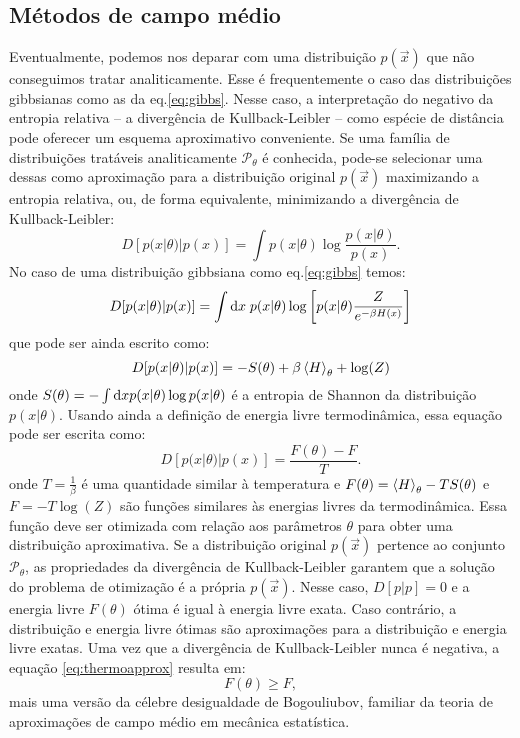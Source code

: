 \subsection{Métodos de campo médio}
Eventualmente, podemos nos deparar com uma distribuição $p(\vec{x})$ que não conseguimos tratar analiticamente. Esse é frequentemente o caso das distribuições gibbsianas como as da eq.\eqref{eq:gibbs}. Nesse caso, a interpretação do negativo da entropia relativa -- a divergência de Kullback-Leibler -- como espécie de distância pode oferecer um esquema aproximativo conveniente. Se uma família de distribuições tratáveis analiticamente $\mathcal{P}_\theta$ é conhecida, pode-se selecionar uma dessas como aproximação para a distribuição original $p(\vec{x})$ maximizando a entropia relativa, ou, de forma equivalente, minimizando a divergência de Kullback-Leibler:
\begin{equation}
 D[ p(x|\theta)|p(x) ] = \int p(x|\theta) \log\frac{p(x|\theta)}{p(x)}.
\end{equation}
No caso de uma distribuição gibbsiana como eq.\eqref{eq:gibbs} temos:
\begin{equation*}
 D[ p(x|\theta)|p(x) ] = \int \mathrm{d} x\; p(x|\theta) \log\left[p(x|\theta)\frac{Z}{e^{-\beta H(x)}}\right]
\end{equation*}
que pode ser ainda escrito como:
\[
 D[ p(x|\theta)|p(x) ] = - S(\theta)  + \beta \left\langle H \right\rangle_{\theta}  + \log(Z)
\]
onde $S(\theta) = - \int \mathrm{d} x p(x|\theta) \log p(x|\theta)$ é a entropia de Shannon da distribuição $p(x|\theta)$. Usando ainda a definição de energia livre termodinâmica, essa equação pode ser escrita como:
\begin{equation}
\label{eq:thermoapprox}
 D[ p(x|\theta)|p(x) ] = \dfrac{F(\theta) - F}{T}.
\end{equation}
onde $T = \frac{1}{\beta}$ é uma quantidade similar à temperatura e $F(\theta) = \left\langle H \right\rangle_{\theta} - T S(\theta)$ e $F = -T\log(Z)$ são funções similares às energias livres da termodinâmica. Essa função deve ser otimizada com relação aos parâmetros $\theta$ para obter uma distribuição aproximativa. Se a distribuição original $p(\vec{x})$ pertence ao conjunto $\mathcal{P}_\theta$, as propriedades da divergência de Kullback-Leibler garantem que a solução do problema de otimização é a própria $p(\vec{x})$. Nesse caso, $D[p|p] = 0$ e a energia livre $F(\theta)$ ótima é igual à energia livre exata. Caso contrário, a distribuição e energia livre ótimas são aproximações para a distribuição e energia livre exatas. Uma vez que a divergência de Kullback-Leibler nunca é negativa, a equação \eqref{eq:thermoapprox} resulta em:
\begin{equation}
 \label{eq:bogouliubov}
  F(\theta) \ge F,
\end{equation}
mais uma versão da célebre desigualdade de Bogouliubov, familiar da teoria de aproximações de campo médio em mecânica estatística.

